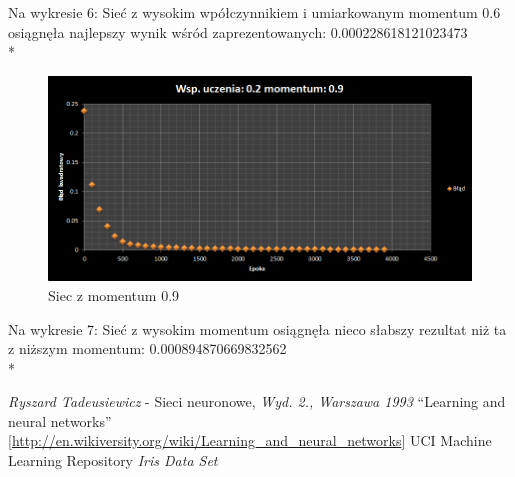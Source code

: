 \documentclass{classrep}
\begin{document}
Na wykresie 6: Sieć z wysokim wpółczynnikiem i umiarkowanym momentum 0.6 osiągnęła najlepszy wynik wśród zaprezentowanych: 0.000228618121023473
\\*

\begin{figure}[ht]
\centering
			\includegraphics[scale=0.65]{pictures/test07.png}
	\caption{Siec z momentum 0.9}
	\label{fig:Siec z momentum 0.9}
\end{figure}

Na wykresie 7: Sieć z wysokim momentum osiągnęła nieco słabszy rezultat niż ta z niższym momentum: 0.000894870669832562
\\*

\clearpage
\begin{thebibliography}{0}
   \textsl{Ryszard Tadeusiewicz} - Sieci neuronowe, \textsl{Wyd. 2., Warszawa 1993}
   ``Learning and neural networks'' [\url{http://en.wikiversity.org/wiki/Learning_and_neural_networks}]
   UCI Machine Learning Repository \textsl{Iris Data Set}
\end{thebibliography}
\end{document}
